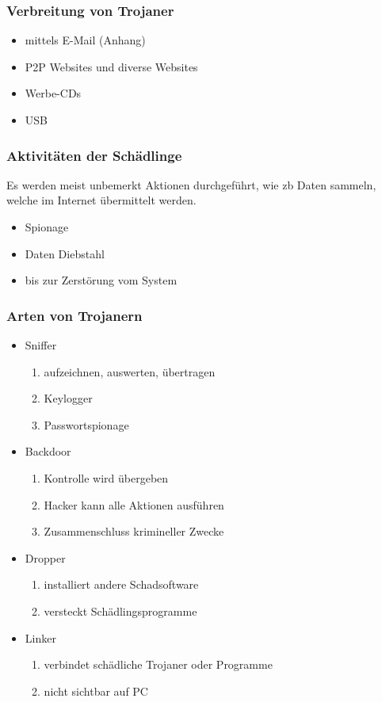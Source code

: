 \documentclass{beamer}
\begin{document}
\begin{frame}
	\frametitle{Verbreitung von Trojaner}
	\begin{itemize}
		\item mittels E-Mail (Anhang)
		\item P2P Websites und diverse Websites
		\item Werbe-CDs
		\item USB
	\end{itemize}
\end{frame}


\begin{frame}
	\frametitle{Aktivitäten der Schädlinge}
	Es werden meist unbemerkt Aktionen durchgeführt, wie zb Daten sammeln, welche im Internet übermittelt werden.
	\begin{itemize}
		\item Spionage
		\item Daten Diebstahl
		\item bis zur Zerstörung vom System
	\end{itemize}
\end{frame}

\begin{frame}
	\frametitle{Arten von Trojanern}
	\begin{itemize}
		\item Sniffer
		\begin{enumerate}
			\item aufzeichnen, auswerten, übertragen
			\item Keylogger
			\item Passwortspionage 
		\end{enumerate}
		\item Backdoor
		\begin{enumerate}
			\item Kontrolle wird übergeben
			\item Hacker kann alle Aktionen ausführen
			\item Zusammenschluss krimineller Zwecke
		\end{enumerate}
		\item Dropper
		\begin{enumerate}
			\item installiert andere Schadsoftware
			\item versteckt Schädlingsprogramme 
		\end{enumerate}
		\item Linker
			\begin{enumerate}
				\item verbindet schädliche Trojaner oder Programme
				\item nicht sichtbar auf PC
			\end{enumerate}
	\end{itemize}
\end{frame}
\end{document}
